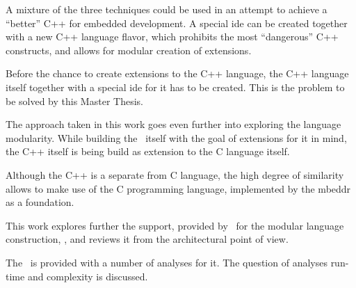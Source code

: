 A mixture of the three techniques could be used in an attempt to achieve a ``better'' C++ for embedded development.
A special \gls{ide} can be created together with a new C++ language flavor, which prohibits the most ``dangerous'' C++
constructs, and allows for modular creation of extensions.

Before the chance to create extensions to the C++ language, the C++ language itself together with a special \gls{ide} for it
has to be created. This is the problem to be solved by this Master Thesis.

The approach taken in this work goes even further into exploring the language modularity. While building the \cpppl\ itself 
with the goal of extensions for it in mind, the C++ itself is being build as extension to the C language itself.

Although the C++ is a separate from C language, the high degree of similarity allows to make use of the C programming language,
implemented by the \gls{mbeddr} as a foundation.

This work explores further the support, provided by \jbmps\ for the modular language construction, \cite{2012_ratiu_modular_dsls_and_analyses},
and reviews it from the architectural point of view.

The \cpppl\ is provided with a number of analyses for it. The question of analyses run-time and complexity is discussed.

